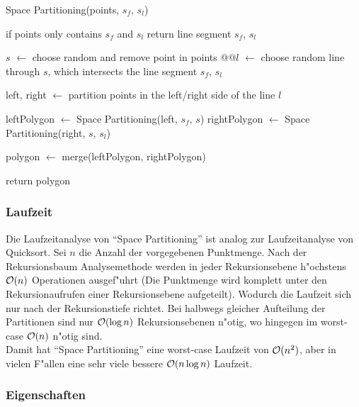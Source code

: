 \begin{code}[caption={Rekursion Space Partitioning}, 
            mathescape=true, escapeinside={@}{@}]
Space Partitioning(points, $s_f$, $s_l$)

  if points only contains $s_f$ and $s_l$
    return line segment $s_f$, $s_l$

  $s$ $\leftarrow$ choose random and remove point in points
  @\label{lst:space_line}@$l$ $\leftarrow$ choose random line through $s$, which intersects the line segment $s_f$, $s_l$

  left, right $\leftarrow$ partition points in the left/right side of the line $l$

  leftPolygon $\leftarrow$ Space Partitioning(left, $s_f$, $s$)
  rightPolygon $\leftarrow$ Space Partitioning(right, $s$, $s_l$)

  polygon $\leftarrow$ merge(leftPolygon, rightPolygon)

  return polygon
\end{code}

  \subsubsection{Laufzeit}

    Die Laufzeitanalyse von ``Space Partitioning'' ist analog zur
    Laufzeitanalyse von Quicksort. Sei $n$ die Anzahl der vorgegebenen
    Punktmenge. Nach der Rekursionsbaum Analysemethode werden in jeder
    Rekursionsebene  h"ochstens $\mathcal{O}(n)$ Operationen ausgef"uhrt (Die
    Punktmenge wird komplett unter den Rekursionaufrufen einer Rekursionsebene
    aufgeteilt). Wodurch die Laufzeit sich nur nach der Rekursionstiefe richtet.
    Bei halbwegs gleicher Aufteilung der Partitionen sind nur $\mathcal{O}(\log n)$
    Rekursionsebenen n"otig, wo hingegen im worst-case $\mathcal{O}(n)$ n"otig sind.
    \\ Damit hat ``Space Partitioning'' eine worst-case Laufzeit von
    $\mathcal{O}(n^2)$, aber in vielen F"allen eine sehr viele bessere $\mathcal{O}(n \log
    n)$ Laufzeit.

  \subsubsection{Eigenschaften}

